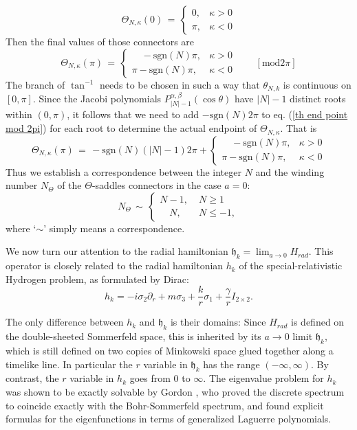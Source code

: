 \documentclass[11 pt]{article}
\renewcommand\({\left(}
\renewcommand\){\right)}
\renewcommand\b{\beta}
\newcommand\<{\langle}
\renewcommand\>{\rangle}
\newcommand\8{\infty}
\renewcommand\a{\alpha}
\newcommand\beq{\begin{equation}}
\newcommand\eeq{\end{equation}}
\newcommand{\ga} {\gamma}\newcommand{\Ga}{\Gamma}
\newcommand{\ka} {\kappa}
\newcommand{\si} {\sigma}\newcommand{\Si}{\Sigma}
\newcommand{\pd}{\partial}
\newcommand{\fh}{\mathfrak{h}}
\newcommand{\sgn}{\mbox{sgn}}
\begin{document}
\begin{equation}
\Theta_{N,\ka}(0) \,=\, \left\{\begin{array}{cc} 0, & \ka>0\\ \pi, & \ka<0
\end{array}\right.
\end{equation}
Then the final values of those connectors are 
\begin{equation}\label{th end point mod 2pi}
\Theta_{N,\ka}(\pi) \,=\, \left\{\begin{array}{cc}\quad  -\sgn(N)\pi, & \ka>0 \\ \pi - \sgn(N) \pi, & \ka<0 \end{array}\right.\qquad [\mbox{mod} 2\pi]
\end{equation}
The branch of $\tan^{-1}$ needs to be chosen in such a way that $\theta_{N,k}$ is continuous on $[0, \pi]$. Since the Jacobi polynomials $P_{|N| - 1}^{\a,\b}(\cos \theta)$ have $|N|-1$ distinct roots within $(0,\pi)$, it follows that we need to add $-\sgn(N) 2\pi$ to eq. (\ref{th end point mod 2pi}) for each root to determine the actual endpoint of $\Theta_{N,\kappa}$. That is
\begin{equation}\label{Thetafinal}
\Theta_{N,\ka}(\pi) \,=\, -\sgn(N)(|N|-1)2\pi+\left\{\begin{array}{cc}\quad -\sgn(N)\pi, & \ka>0 \\ \pi - \sgn(N)\pi, & \ka<0 \end{array}\right.
\end{equation}
Thus we establish a correspondence between the integer $N$ and the winding number $N_\Theta$ of the $\Theta$-saddles connectors in the case $a=0$:
\beq\label{Thetaconn}
N_\Theta \,\sim\, 
\left\{\begin{array}{cc} N - 1, & N \geq 1 
\\ 
\quad N,\quad & N \leq -1, \end{array}\right.
\eeq
where `$\sim$' simply means a correspondence. 



We now turn our attention to the radial hamiltonian $\fh_k =\lim_{a\to 0} H_{rad}$. This operator is closely related to the radial hamiltonian $h_k$ of the special-relativistic Hydrogen problem, as formulated by Dirac\cite{Dir28}:
\begin{equation}
h_k = -i\si_2 \pd_r + m \si_3 + \frac{k}{r} \si_1 + \frac{\ga}{r} I_{2\times 2}.
\end{equation}

The only difference between $h_k$ and $\fh_k$ is their domains:  Since $H_{rad}$ is defined on the double-sheeted Sommerfeld space, this is inherited by its $a\to 0$ limit $\fh_k$, which is still defined on two copies of Minkowski space glued together along a timelike line.  In particular the $r$ variable in $\fh_k$ has the range $(-\infty,\infty)$.  By contrast, the $r$ variable in $h_k$ goes from $0$ to $\infty$.
  The eigenvalue problem for $h_k$ was shown to be exactly solvable by Gordon \cite{Gor28}, who proved the discrete spectrum to coincide exactly with the Bohr-Sommerfeld spectrum, and found explicit formulas for the eigenfunctions in terms of generalized Laguerre polynomials.
\end{document}

